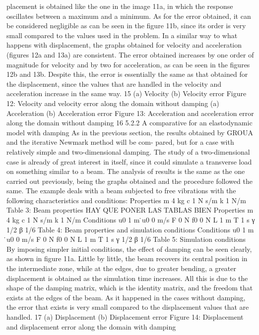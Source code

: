 \documentclass[a4paper, 10pt]{article}
\begin{document}
placement is obtained like the one in the image 11a, in which the response oscillates between a maximum
and a minimum. As for the error obtained, it can be considered negligible as can be seen in the figure 11b,
since its order is very small compared to the values used in the problem.
In a similar way to what happens with displacement, the graphs obtained for velocity and acceleration
(figures 12a and 13a) are consistent. The error obtained increases by one order of magnitude for velocity and
by two for acceleration, as can be seen in the figures 12b and 13b. Despite this, the error is essentially the
same as that obtained for the displacement, since the values that are handled in the velocity and acceleration
increase in the same way.
15
(a) Velocity (b) Velocity error
Figure 12: Velocity and velocity error along the domain without damping
(a) Acceleration (b) Acceleration error
Figure 13: Acceleration and acceleration error along the domain without damping
16
5.2.2 A comparative for an elastodynamic model with damping
As in the previous section, the results obtained by GROUA and the iterative Newmark method will be com-
pared, but for a case with relatively simple and two-dimensional damping. The study of a two-dimensional
case is already of great interest in itself, since it could simulate a transverse load on something similar to
a beam. The analysis of results is the same as the one carried out previously, being the graphs obtained
and the procedure followed the same. The example deals with a beam subjected to free vibrations with the
following characteristics and conditions:
Properties
m 4 kg
c 1 N s/m
k 1 N/m
Table 3: Beam properties
HAY QUE PONER LAS TABLAS BIEN
Properties
m 4 kg
c 1 N s/m
k 1 N/m
Conditions
u0 1 m
 ̇u0 0 m/s
F 0 N
f0 0 N
L 1 m
T 1 s
γ 1/2
β 1/6
Table 4: Beam properties and simulation conditions
Conditions
u0 1 m
 ̇u0 0 m/s
F 0 N
f0 0 N
L 1 m
T 1 s
γ 1/2
β 1/6
Table 5: Simulation conditions
By imposing simpler initial conditions, the effect of damping can be seen clearly, as shown in figure 11a.
Little by little, the beam recovers its central position in the intermediate zone, while at the edges, due to
greater bending, a greater displacement is obtained as the simulation time increases. All this is due to the
shape of the damping matrix, which is the identity matrix, and the freedom that exists at the edges of the
beam.
As it happened in the cases without damping, the error that exists is very small compared to the
displacement values that are handled.
17
(a) Displacement (b) Displacement error
Figure 14: Displacement and displacement error along the domain with damping
\end{document}
